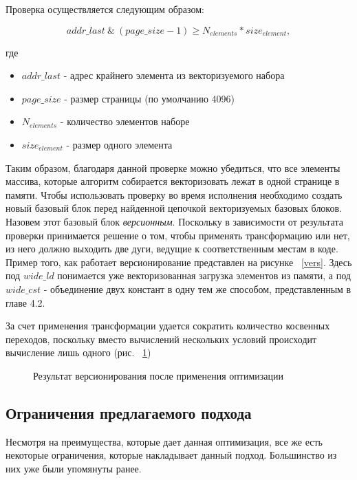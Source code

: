 Проверка осуществляется следующим образом:

\begin{equation}
    addr\_last \ \& \ (page\_size - 1) \ge N_{elements} * size_{element},
\end{equation}

где 

\begin{itemize}
    \item $addr\_last$ - адрес крайнего элемента из векторизуемого набора
    \item $page\_size$ - размер страницы (по умолчанию 4096)
    \item $N_{elements}$ - количество элементов наборе
    \item $size_{element}$ - размер одного элемента
\end{itemize}

Таким образом, благодаря данной проверке можно убедиться, что все элементы массива, которые алгоритм собирается векторизовать лежат в одной странице в памяти. Чтобы использовать проверку во время исполнения необходимо создать новый базовый блок перед найденной цепочкой векторизуемых базовых блоков. Назовем этот базовый блок \textit{версионным}. Поскольку в зависимости от результата проверки принимается решение о том, чтобы применять трансформацию или нет, из него должно выходить две дуги, ведущие к соответственным местам в коде. Пример того, как работает версионирование представлен на рисунке ~\ref{vers}. Здесь под $wide\_ld$ понимается уже векторизованная загрузка элементов из памяти, а под $wide\_cst$ - объединение двух констант в одну тем же способом, представленным в главе 4.2.


За счет применения трансформации удается сократить количество косвенных переходов, поскольку вместо вычислений нескольких условий происходит вычисление лишь одного (рис. ~\ref{spec})

\begin{figure}[!htb]
    \centering
    
    \caption{Результат версионирования после применения оптимизации}
    \label{spec}
\end{figure}

\subsection{Ограничения предлагаемого подхода}

Несмотря на преимущества, которые дает данная оптимизация, все же есть некоторые ограничения, которые накладывает данный подход. Большинство из них уже были упомянуты ранее.

